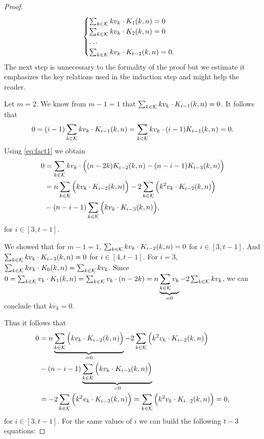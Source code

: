 \begin{proof}
    \begin{equation*}
        \begin{cases}
            \sum_{k \in \mathcal{K}} kv_k \cdot K_1(k, n) = 0\\
            \sum_{k \in \mathcal{K}} kv_k \cdot K_2(k, n) = 0\\
            \ldots\\
            \sum_{k \in \mathcal{K}} kv_k \cdot K_{t-2}(k, n) = 0.\\
        \end{cases}
    \end{equation*}
    The next step is unnecessary to the formality of the proof but we estimate it emphasizes the key relations used in the induction step and might help the reader.

    Let $m = 2$. We know from $m - 1 = 1$ that $\sum_{k \in \mathcal{K}} kv_k \cdot K_{i-1}(k, n) = 0$. It follows that
    $$
    0 = (i-1)\sum_{k \in \mathcal{K}} kv_k \cdot K_{i-1}(k, n) = \sum_{k \in \mathcal{K}} kv_k \cdot (i-1)K_{i-1}(k, n) = 0.
    $$
    Using \cref{eq:fact1} we obtain
    \begin{equation*}
    \begin{split}
        0 &= \sum_{k \in \mathcal{K}} kv_k \cdot \Big( (n - 2k)K_{i-2}(k, n) - (n - i - 1)K_{i-3}(k, n) \Big)\\
        & = n \sum_{k \in \mathcal{K}} \Big( kv_k \cdot K_{i-2}(k, n) \Big) - 2\sum_{k \in \mathcal{K}} \Big( k^2v_k \cdot K_{i-2}(k, n) \Big)\\& - (n - i - 1)\sum_{k \in \mathcal{K}} \Big( kv_k \cdot K_{i-3}(k, n) \Big),
    \end{split}
    \end{equation*}
    for $i \in [3, t - 1]$.

    We showed that for $m - 1 = 1$, $\sum_{k \in \mathcal{K}} kv_k \cdot K_{i-2}(k,n) = 0$ for $i \in [3, t-1]$. And $\sum_{k \in \mathcal{K}} kv_k \cdot K_{i-3}(k,n) = 0$ for $i \in [4, t-1]$. For $i = 3$, $\sum_{k \in \mathcal{K}} kv_k \cdot K_0(k, n) = \sum_{k \in \mathcal{K}} kv_k$. Since $0 = \sum_{k \in \mathcal{K}} v_k \cdot K_1(k, n) = \sum_{k \in \mathcal{K}} v_k \cdot(n - 2k) = n\underbrace{\sum_{k \in \mathcal{K}} v_k}_{=0} -2\sum_{k \in \mathcal{K}} kv_k$, we can conclude that $ kv_k = 0$.

    Thus it follows that
    \begin{equation*}
        \begin{split}
            0 &= n \underbrace{\sum_{k \in \mathcal{K}} \Big( kv_k \cdot K_{i-2}(k, n) \Big)}_{=0} - 2\sum_{k \in \mathcal{K}} \Big( k^2v_k \cdot K_{i-2}(k, n) \Big)\\& - (n - i - 1)\underbrace{\sum_{k \in \mathcal{K}} \Big( kv_k \cdot K_{i-3}(k, n) \Big)}_{=0}\\
            &= - 2\sum_{k \in \mathcal{K}} \Big( k^2v_k \cdot K_{i-2}(k, n) \Big) = \sum_{k \in \mathcal{K}} \Big( k^2v_k \cdot K_{i-2}(k, n) \Big) = 0,
        \end{split}
    \end{equation*}
    for $i \in [3, t-1]$. For the same values of $i$ we can build the following $t-3$ equations:


\end{proof}
